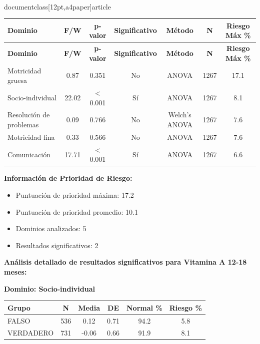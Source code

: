 \\documentclass[12pt,a4paper]{article}
\begin{document}
\begin{longtable}{|l|c|c|c|c|c|c|}
\hline
\textbf{Dominio} & \textbf{F/W} & \textbf{p-valor} & \textbf{Significativo} & \textbf{Método} & \textbf{N} & \textbf{Riesgo Máx \%} \\
\hline
\endfirsthead

\hline
\textbf{Dominio} & \textbf{F/W} & \textbf{p-valor} & \textbf{Significativo} & \textbf{Método} & \textbf{N} & \textbf{Riesgo Máx \%} \\
\hline
\endhead

\hline
\endfoot

\hline
\endlastfoot

Motricidad gruesa & 0.87 & 0.351 & No & ANOVA & 1267 & 17.1 \\
Socio-individual & 22.02 & < 0.001 & Sí & ANOVA & 1267 & 8.1 \\
Resolución de problemas & 0.09 & 0.766 & No & Welch's ANOVA & 1267 & 7.6 \\
Motricidad fina & 0.33 & 0.566 & No & ANOVA & 1267 & 7.6 \\
Comunicación & 17.71 & < 0.001 & Sí & ANOVA & 1267 & 6.6 \\

\end{longtable}


\textbf{Información de Prioridad de Riesgo:}
\begin{itemize}
\item Puntuación de prioridad máxima: 17.2
\item Puntuación de prioridad promedio: 10.1
\item Dominios analizados: 5
\item Resultados significativos: 2
\end{itemize}


\textbf{Análisis detallado de resultados significativos para Vitamina A 12-18 meses:}


\textbf{Dominio: Socio-individual}


\begin{center}
\begin{tabular}{|l|c|c|c|c|c|}
\hline
\textbf{Grupo} & \textbf{N} & \textbf{Media} & \textbf{DE} & \textbf{Normal \%} & \textbf{Riesgo \%} \\
\hline
FALSO & 536 & 0.12 & 0.71 & 94.2 & 5.8 \\
VERDADERO & 731 & -0.06 & 0.66 & 91.9 & 8.1 \\

\hline
\end{tabular}
\end{center}
\end{document}
